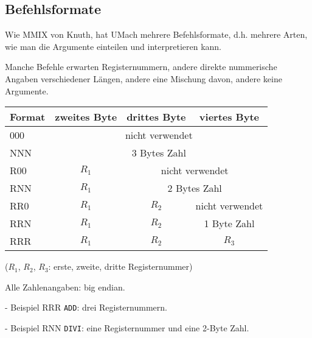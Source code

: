 \subsection{Befehlsformate}

\begin{frame}{\insertsubsection}
 Wie MMIX von Knuth, hat UMach mehrere Befehlsformate, d.h. mehrere Arten, wie
 man die Argumente einteilen und interpretieren kann.
 
 Manche Befehle erwarten Registernummern, andere direkte nummerische Angaben
 verschiedener Längen, andere eine Mischung davon, andere keine Argumente.
\end{frame}


\begin{frame}{\insertsubsection}
 \begin{center}
  \begin{tabular}{l||c|c|c}
    \toprule
    Format & zweites Byte  & drittes Byte  & viertes Byte \\\toprule
    000 & \multicolumn{3}{c}{nicht verwendet}           \\\midrule
    NNN & \multicolumn{3}{c}{3 Bytes Zahl}              \\\midrule
    R00 & $R_{1}$ & \multicolumn{2}{c}{nicht verwendet} \\\midrule
    RNN & $R_{1}$ & \multicolumn{2}{c}{2 Bytes Zahl}    \\\midrule
    RR0 & $R_{1}$ & $R_{2}$ &  nicht verwendet           \\\midrule
    RRN & $R_{1}$ & $R_{2}$ &  1 Byte Zahl               \\\midrule
    RRR & $R_{1}$ & $R_{2}$ & $R_{3}$                    \\\bottomrule
  \end{tabular}
\end{center}
($R_{1}$, $R_{2}$, $R_{3}$: erste, zweite, dritte Registernummer)

Alle Zahlenangaben: big endian.
\end{frame}



\begin{frame}{\insertsubsection{} - Beispiel RRR}
 \texttt{ADD}: drei Registernummern.
 \begin{center}
  
 \end{center}
\end{frame}

\begin{frame}{\insertsubsection{} - Beispiel RNN}
 \texttt{DIVI}: eine Registernummer und eine 2-Byte Zahl.
 \begin{center}
  
 \end{center}
\end{frame}

